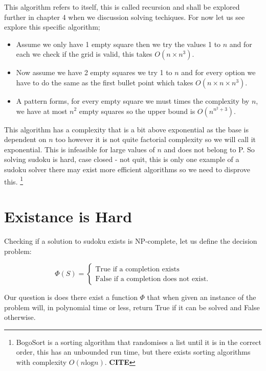 \documentclass[a4paper,11pt]{report}
\begin{document}
This algorithm refers to itself, this is called recursion and shall be explored further in chapter 4 when we discussion solving techiques. For now let us see explore this specific algorithm; 
\begin{itemize}
\item Assume we only have 1 empty square then we try the values 1 to $n$ and for each we check if the grid is valid, this takes $O(n\times n^3)$.
\item Now assume we have 2 empty squares we try 1 to $n$ and for every option we have to do the same as the first bullet point which takes $O(n\times n \times n^3)$.
\item A pattern forms, for every empty square we must times the complexity by $n$, we have at most $n^2$ empty squares so the upper bound is $O(n^{n^2+3})$.
\end{itemize}
This algorithm has a complexity that is a bit above exponential as the base is dependent on $n$ too however it is not quite factorial complexity so we will call it exponential. This is infeasible for large values of $n$ and does not belong to P. So solving sudoku is hard, case closed - not quit, this is only one example   of a sudoku solver there may exist more efficient algorithms so we need to disprove this. \footnote{BogoSort is a sorting algorithm that randomises a list until it is in the correct order, this has an unbounded run time, but there exists sorting algorithms with complexity $O(n\text{log}n)$. \textbf{CITE}} 




\section{Existance is Hard}
		
Checking if a solution to sudoku exists is NP-complete, let us define the decision problem:

		\begin{equation}
		        \Phi (S) = \begin{cases}
		            \text{True if a completion exists} \\
		            \text{False if a completion does not exist}.
				\end{cases}
		\end{equation}

Our question is does there exist a function $\Phi$ that when given an instance of the problem will, in polynomial time or less,
return True if it can be solved and False otherwise.
\end{document}
